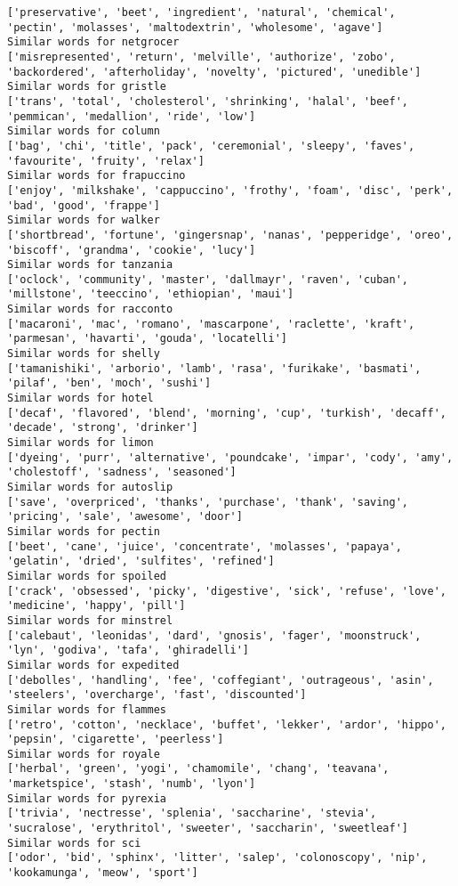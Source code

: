 \documentclass[11pt]{article}
\begin{document}
\begin{Verbatim}[commandchars=\\\{\}]
['preservative', 'beet', 'ingredient', 'natural', 'chemical', 'pectin', 'molasses', 'maltodextrin', 'wholesome', 'agave']
Similar words for netgrocer
['misrepresented', 'return', 'melville', 'authorize', 'zobo', 'backordered', 'afterholiday', 'novelty', 'pictured', 'unedible']
Similar words for gristle
['trans', 'total', 'cholesterol', 'shrinking', 'halal', 'beef', 'pemmican', 'medallion', 'ride', 'low']
Similar words for column
['bag', 'chi', 'title', 'pack', 'ceremonial', 'sleepy', 'faves', 'favourite', 'fruity', 'relax']
Similar words for frapuccino
['enjoy', 'milkshake', 'cappuccino', 'frothy', 'foam', 'disc', 'perk', 'bad', 'good', 'frappe']
Similar words for walker
['shortbread', 'fortune', 'gingersnap', 'nanas', 'pepperidge', 'oreo', 'biscoff', 'grandma', 'cookie', 'lucy']
Similar words for tanzania
['oclock', 'community', 'master', 'dallmayr', 'raven', 'cuban', 'millstone', 'teeccino', 'ethiopian', 'maui']
Similar words for racconto
['macaroni', 'mac', 'romano', 'mascarpone', 'raclette', 'kraft', 'parmesan', 'havarti', 'gouda', 'locatelli']
Similar words for shelly
['tamanishiki', 'arborio', 'lamb', 'rasa', 'furikake', 'basmati', 'pilaf', 'ben', 'moch', 'sushi']
Similar words for hotel
['decaf', 'flavored', 'blend', 'morning', 'cup', 'turkish', 'decaff', 'decade', 'strong', 'drinker']
Similar words for limon
['dyeing', 'purr', 'alternative', 'poundcake', 'impar', 'cody', 'amy', 'cholestoff', 'sadness', 'seasoned']
Similar words for autoslip
['save', 'overpriced', 'thanks', 'purchase', 'thank', 'saving', 'pricing', 'sale', 'awesome', 'door']
Similar words for pectin
['beet', 'cane', 'juice', 'concentrate', 'molasses', 'papaya', 'gelatin', 'dried', 'sulfites', 'refined']
Similar words for spoiled
['crack', 'obsessed', 'picky', 'digestive', 'sick', 'refuse', 'love', 'medicine', 'happy', 'pill']
Similar words for minstrel
['calebaut', 'leonidas', 'dard', 'gnosis', 'fager', 'moonstruck', 'lyn', 'godiva', 'tafa', 'ghiradelli']
Similar words for expedited
['debolles', 'handling', 'fee', 'coffegiant', 'outrageous', 'asin', 'steelers', 'overcharge', 'fast', 'discounted']
Similar words for flammes
['retro', 'cotton', 'necklace', 'buffet', 'lekker', 'ardor', 'hippo', 'pepsin', 'cigarette', 'peerless']
Similar words for royale
['herbal', 'green', 'yogi', 'chamomile', 'chang', 'teavana', 'marketspice', 'stash', 'numb', 'lyon']
Similar words for pyrexia
['trivia', 'nectresse', 'splenia', 'saccharine', 'stevia', 'sucralose', 'erythritol', 'sweeter', 'saccharin', 'sweetleaf']
Similar words for sci
['odor', 'bid', 'sphinx', 'litter', 'salep', 'colonoscopy', 'nip', 'kookamunga', 'meow', 'sport']

\end{Verbatim}
\end{document}
